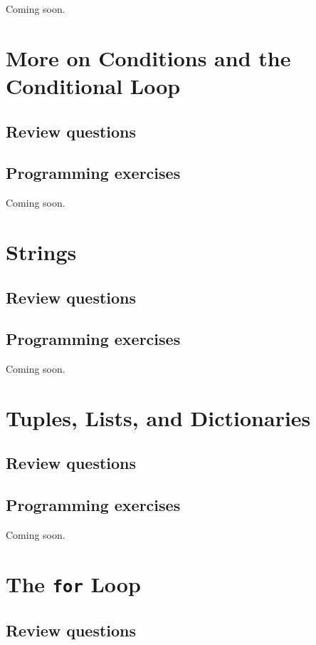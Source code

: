 \documentclass[article,A4,12pt]{llncs}
\begin{document}
Coming soon.


\section{More on Conditions and the Conditional Loop}

\subsection{Review questions}

\subsection{Programming exercises}

Coming soon.


\section{Strings}

\subsection{Review questions}

\subsection{Programming exercises}

Coming soon.


\section{Tuples, Lists, and Dictionaries}

\subsection{Review questions}

\subsection{Programming exercises}

Coming soon.


\section{The {\tt for} Loop} 

\subsection{Review questions}
\end{document}
